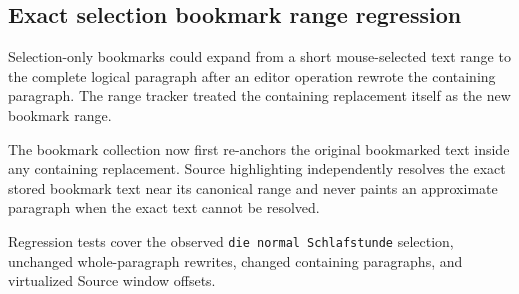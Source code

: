 \documentclass[a4paper]{article}
\title{}
\date{}
\author{Mohammad Rahmani}
\begin{document}
   \maketitle

   \begin{preview}
      \section*{Exact selection bookmark range regression}
      Selection-only bookmarks could expand from a short mouse-selected text
      range to the complete logical paragraph after an editor operation rewrote
      the containing paragraph. The range tracker treated the containing
      replacement itself as the new bookmark range.

      The bookmark collection now first re-anchors the original bookmarked text
      inside any containing replacement. Source highlighting independently
      resolves the exact stored bookmark text near its canonical range and never
      paints an approximate paragraph when the exact text cannot be resolved.

      Regression tests cover the observed \texttt{die normal Schlafstunde}
      selection, unchanged whole-paragraph rewrites, changed containing
      paragraphs, and virtualized Source window offsets.
   \end{preview}

   
   
\end{document}
